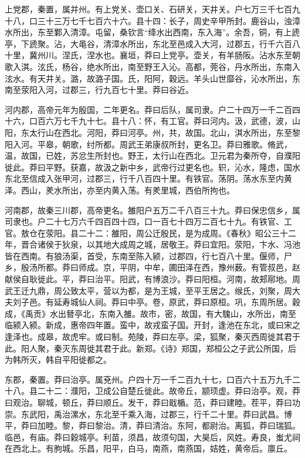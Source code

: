 \documentclass[12pt,UTF8]{ctexbook}
\begin{document}
上党郡，秦置，属并州。有上党关、壶口关、石研关，天井关。户七万三千七百九十八，口三十三万七千七百六十六。县十四：长子，周史辛甲所封。鹿谷山，浊漳水所出，东至鄴入清漳。屯留，桑钦言“绛水出西南，东入海”。余吾，铜，有上虒亭，下虒聚。沾，大黾谷，清漳水所出，东北至邑成入大河，过郡五，行千六百八十里，冀州川。涅氏，涅水也。襄垣，莽曰上党亭。壶关，有羊肠阪。沾水东至朝歌入淇。泫氏，杨谷，绝水所出，南至野王入沁。高都，莞谷，丹水所出，东南入泫水。有天井关。潞，故潞子国。氏，阳阿，穀远。羊头山世靡谷，沁水所出，东南至荥阳入河，过郡三，行九百七十里。莽曰谷近。



河内郡，高帝元年为殷国，二年更名。莽曰后队，属司隶。户二十四万一千二百四十六，口百六万七千九十七。县十八：怀，有工官。莽曰河内。汲，武德，波，山阳，东太行山在西北。河阳，莽曰河亭。州，共，故国。北山，淇水所出，东至黎阳入河。平皋，朝歌，纣所都。周武王弟康叔所封，更名卫。莽曰雅歌。脩武，温，故国，已姓，苏忿生所封也。野王，太行山在西北。卫元君为秦所夺，自濮阳徙此。莽曰平野。获嘉，故汲之新中乡，武帝行过更名也。轵，沁水，隆虑，国水东北至信成入张甲河，过郡三，行千八百四十里。有铁官。荡阴。荡水东至内黄泽。西山，羑水所出，亦至内黄入荡。有羑里城，西伯所拘也。



河南郡，故秦三川郡，高帝更名。雒阳户五万二千八百三十九。莽曰保忠信乡，属司隶也。户二十七万六千四百四十四，口一百七十四万二百七十九。有铁官、工官。敖仓在荥阳。县二十二：雒阳，周公迁殷民，是为成周。《春秋》昭公三十二年，晋合诸侯于狄泉，以其地大成周之城，居敬王。莽曰宜阳。荥阳，卞水、冯池皆在西南。有狼汤渠，首受，东南至陈入颍，过郡四，行七百八十里。偃师，尸乡，殷汤所都。莽曰师成。京，平阴，中牟，圃田泽在西，豫州薮。有管叔邑，赵献侯自耿徙此。平，莽曰治平。阳武，有博浪沙。莽曰阳桓。河南，故郏鄏地。周武王迁九鼎，周公致太平，营以为都，是为王城，至平王居之。缑氏，刘聚，周大夫刘子邑。有延寿城仙人祠。莽曰中亭。卷，原武，莽曰原桓。巩，东周所居。穀成，《禹贡》水出朁亭北，东南入雒。故市，密，故国，有大騩山，水所出，南至临颍入颍。新成，惠帝四年置。蛮中，故戎蛮子国。开封，逢池在东北，或曰宋之逢泽也。成皋，故虎牢。或曰制。苑陵，莽曰左亭。梁，狐聚，秦灭西周徙其君于此。阳人聚，秦灭东周徙其君于此。新郑。《诗》郑国，郑桓公之子武公所国，后为韩所灭，韩自平阳徙都之。



东郡，秦置。莽曰治亭。属兗州。户四十万一千二百九十七，口百六十五万九千二十八。县二十二：濮阳，卫成公自楚丘徙此。故帝丘，颛顼虚。莽曰治亭。观，莽曰观治。聊城，顿丘，莽曰顺丘。发干，莽曰戢楯。范，莽曰建睦。茬平，莽曰功崇。东武阳，禹治漯水，东北至千乘入海，过郡三，行千二十里。莽曰武昌。博平，莽曰加睦。黎，莽曰黎治。清，莽曰清治。东阿，都尉治。离狐，莽曰瑞狐。临邑，有庙。莽曰穀城亭。利苗，须昌，故须句国，大昊后，风姓。寿良，蚩尤祠在西北上。有朐城。乐昌，阳平，白马，南燕，南燕国，姞姓，黄帝后。廪丘。
\end{document}
